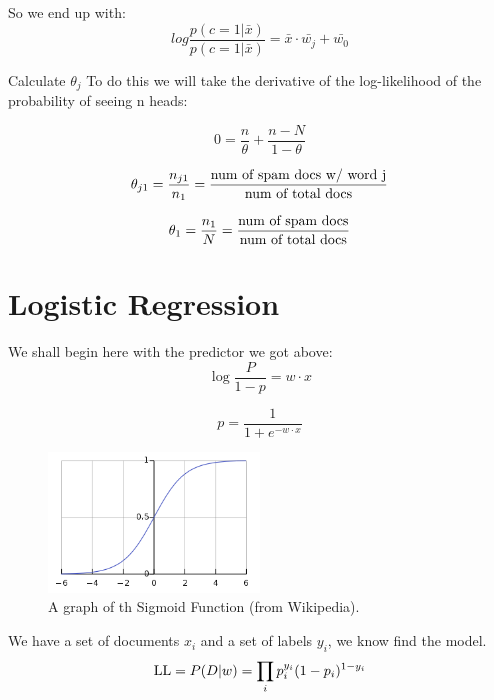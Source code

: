 So we end up with:
\begin{equation}
log\frac{p(c=1|\bar{x})}{p(c=1|\bar{x})} = \bar{x}\cdot\bar{w_{j}} +\bar{w_{0}}
\end{equation}

Calculate $\theta_{j}$
To do this we will take the derivative of the log-likelihood of the probability of seeing n heads:

\begin{equation}
0 = \frac{n}{\theta} + \frac{n - N}{1 - \theta}
\end{equation}

\begin{equation}
\theta_{j1}=\frac{n_{j1}}{n_{1}}=\frac{\textnormal{num of spam docs w/ word j}}{\textnormal{num of total docs}}
\end{equation}

\begin{equation}
\theta_{1}=\frac{n_{1}}{N}=\frac{\textnormal{num of spam docs}}{\textnormal{num of total docs}}
\end{equation}

\section{Logistic Regression}
We shall begin here with the predictor we got above: 
\begin{equation}
\log{\frac{P}{1-p}} = w\cdot x
\end{equation}

\begin{equation}
p = \frac{1}{1+e^{-w\cdot x}}
\end{equation}
\begin{figure}[ht]
  \begin{center}
    \includegraphics[width=0.5\textwidth]{figures/pic1.png}
    \caption{
      A graph of th Sigmoid Function (from Wikipedia). 
      }
    \label{fig:example_figure}
  \end{center}
\end{figure}
We have a set of documents $x_i$ and a set of labels $y_i$, we know find the model.
\begin{equation}
\textnormal{LL} = P(D|w) = \prod_{i} {p_{i}^{y_{i}} (1-p_{i}) ^ {1-y_{i}}}
\end{equation}

